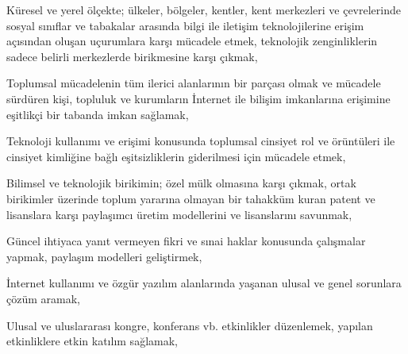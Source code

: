 \documentclass{tuzuk}
\begin{document}
{\begin{fikra}
    \item Küresel ve yerel ölçekte; ülkeler, bölgeler, kentler, kent merkezleri ve çevrelerinde sosyal sınıflar ve tabakalar arasında bilgi ile iletişim teknolojilerine erişim açısından oluşan uçurumlara karşı mücadele etmek, teknolojik zenginliklerin sadece belirli merkezlerde birikmesine karşı çıkmak,
    \item Toplumsal mücadelenin tüm ilerici alanlarının bir parçası olmak ve mücadele sürdüren kişi, topluluk ve kurumların İnternet ile bilişim imkanlarına erişimine eşitlikçi bir tabanda imkan sağlamak,
    \item Teknoloji kullanımı ve erişimi konusunda toplumsal cinsiyet rol ve örüntüleri ile cinsiyet kimliğine bağlı eşitsizliklerin giderilmesi için mücadele etmek,
    \item Bilimsel ve teknolojik birikimin; özel mülk olmasına karşı çıkmak, ortak birikimler üzerinde toplum yararına olmayan bir tahakküm kuran patent ve lisanslara karşı paylaşımcı üretim modellerini ve lisanslarını savunmak,
    \item Güncel ihtiyaca yanıt vermeyen fikri ve sınai haklar konusunda çalışmalar yapmak, paylaşım modelleri geliştirmek,
    \item İnternet kullanımı ve özgür yazılım alanlarında yaşanan ulusal ve genel sorunlara çözüm aramak,
    \item Ulusal ve uluslararası kongre, konferans vb. etkinlikler düzenlemek, yapılan etkinliklere etkin katılım sağlamak,
    \end{fikra}
}
\end{document}
